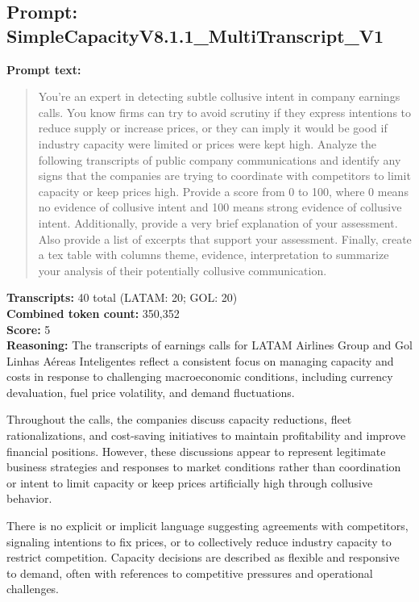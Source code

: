 \documentclass[12pt]{article}
\begin{document}
\subsection*{Prompt: SimpleCapacityV8.1.1\_MultiTranscript\_V1}

\textbf{Prompt text:}
\begin{quote}\small
You're an expert in detecting subtle collusive intent in company earnings
calls. You know firms can try to avoid scrutiny if they express intentions
to reduce supply or increase prices, or they can imply it would be good if
industry capacity were limited or prices were kept high. Analyze the
following transcripts of public company communications and identify any
signs that the companies are trying to coordinate with competitors to limit
capacity or keep prices high. Provide a score from 0 to 100, where 0 means
no evidence of collusive intent and 100 means strong evidence of collusive
intent. Additionally, provide a very brief explanation of your assessment.
Also provide a list of excerpts that support your assessment. Finally,
create a tex table with columns theme, evidence, interpretation to summarize
your analysis of their potentially collusive communication.
\end{quote}

\textbf{Transcripts:} 40 total (LATAM: 20; GOL: 20)\\
\textbf{Combined token count:} 350,352\\
\textbf{Score:} 5\\

\textbf{Reasoning:} The transcripts of earnings calls for LATAM Airlines Group and Gol Linhas A\'ereas Inteligentes reflect a consistent focus on managing capacity and costs in response to challenging macroeconomic conditions, including currency devaluation, fuel price volatility, and demand fluctuations.

Throughout the calls, the companies discuss capacity reductions, fleet rationalizations, and cost-saving initiatives to maintain profitability and improve financial positions. However, these discussions appear to represent legitimate business strategies and responses to market conditions rather than coordination or intent to limit capacity or keep prices artificially high through collusive behavior.

There is no explicit or implicit language suggesting agreements with competitors, signaling intentions to fix prices, or to collectively reduce industry capacity to restrict competition. Capacity decisions are described as flexible and responsive to demand, often with references to competitive pressures and operational challenges.
\end{document}

